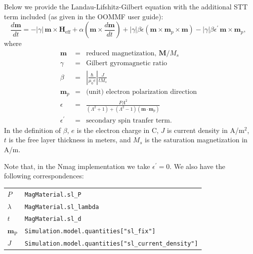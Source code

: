 \documentclass[11pt,oneside,openany]{article}
\newcommand{\vect}[1]{\mathbf{#1}}
\newcommand{\vecs}[2]{\mathbf{#1_{\mathrm{#2}}}}
\newcommand{\vm}{\vect{m}}
\newcommand{\vM}{\vect{M}}
\begin{document}
Below we provide the Landau-Lifshitz-Gilbert equation with the additional STT term
included (as given in the OOMMF user guide):
\begin{equation}
  \frac{d\vm}{dt} = -|\gamma|\,\vm\times\vecs{H}{eff}
   + \alpha
     \left(\vm\times\frac{d\vm}{dt}\right)
   + |\gamma|\beta\epsilon
     \left(\vm\times\vm_p\times\vm\right)
   - |\gamma|\beta\epsilon^\prime\,\vm\times\vm_p,
\label{eq:oxsllgspinxfer}
\end{equation}
where
\begin{eqnarray*}
\vm & = & \mbox{reduced magnetization, $\vM/M_s$} \\
\gamma & = & \mbox{Gilbert gyromagnetic ratio} \\
\beta & = & \left|\frac{\hbar}{\mu_0 e}\right|\frac{J}{t M_s} \\
\vm_p & = & \mbox{(unit) electron polarization direction} \\
\epsilon & = &
\frac{P\Lambda^2}{(\Lambda^2+1)+(\Lambda^2-1)(\vm\cdot\vm_p)} \\
\epsilon^\prime & = & \mbox{secondary spin tranfer term}.
\end{eqnarray*}
In the definition of $\beta$, $e$ is the electron charge in C, $J$ is
current density in A/m${}^2$, $t$ is the free layer thickness in meters,
and $M_s$ is the saturation magnetization in A/m.

Note that, in the Nmag implementation we take $\epsilon^\prime = 0$.
We also have the following correspondences:

\begin{tabular}{ll}
$P$ & \verb|MagMaterial.sl_P| \\
$\lambda$ & \verb|MagMaterial.sl_lambda| \\
$t$ & \verb|MagMaterial.sl_d| \\
$\vecs{m}{P}$ & \verb|Simulation.model.quantities["sl_fix"]| \\
$J$ & \verb|Simulation.model.quantities["sl_current_density"]| \\
\end{tabular}
\end{document}
